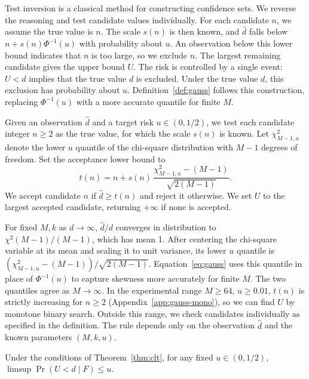 Test inversion is a classical method for constructing confidence sets\cite{neyman1937}. We reverse the reasoning and test candidate values individually. For each candidate $n$, we assume the true value is $n$. The scale $s(n)$ is then known, and $\widehat d$ falls below $n+s(n)\Phi^{-1}(u)$ with probability about $u$. An observation below this lower bound indicates that $n$ is too large, so we exclude $n$. The largest remaining candidate gives the upper bound $U$. The risk is controlled by a single event: $U<d$ implies that the true value $d$ is excluded. Under the true value $d$, this exclusion has probability about $u$. Definition~\ref{def:gauss} follows this construction, replacing $\Phi^{-1}(u)$ with a more accurate quantile for finite $M$.

\begin{definition}\label{def:gauss}
Given an observation $\widehat d$ and a target risk $u\in(0,1/2)$, we test each candidate integer $n\ge2$ as the true value, for which the scale $s(n)$ is known. Let $\chi^2_{M-1,u}$ denote the lower $u$ quantile of the chi-square distribution with $M-1$ degrees of freedom. Set the acceptance lower bound to
\begin{equation}
t(n)=n+s(n)\,\frac{\chi^2_{M-1,u}-(M-1)}{\sqrt{2(M-1)}}.\label{eq:gauss}
\end{equation}
We accept candidate $n$ if $\widehat d\ge t(n)$ and reject it otherwise. We set $U$ to the largest accepted candidate, returning $+\infty$ if none is accepted.
\end{definition}

For fixed $M,k$ as $d\to\infty$, $\widehat d/d$ converges in distribution to $\chi^2(M-1)/(M-1)$\cite{wu2026selfsizing}, which has mean 1. After centering the chi-square variable at its mean and scaling it to unit variance, its lower $u$ quantile is $(\chi^2_{M-1,u}-(M-1))/\sqrt{2(M-1)}$. Equation~\eqref{eq:gauss} uses this quantile in place of $\Phi^{-1}(u)$ to capture skewness more accurately for finite $M$. The two quantiles agree as $M\to\infty$. In the experimental range $M\ge64$, $u\ge0.01$, $t(n)$ is strictly increasing for $n\ge2$ (Appendix~\ref{app:gauss-mono}), so we can find $U$ by monotone binary search. Outside this range, we check candidates individually as specified in the definition. The rule depends only on the observation $\widehat d$ and the known parameters $(M,k,u)$.

\begin{corollary}\label{cor:gauss}
Under the conditions of Theorem~\ref{thm:clt}, for any fixed $u\in(0,1/2)$, $\limsup\Pr(U<d\mid F)\le u$.
\end{corollary}

